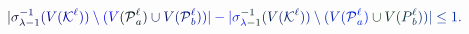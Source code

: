 \documentclass[12pt]{article}
\begin{document}
\makeatletter
\renewcommand*{\@textcolor}[3]{%
  \protect\leavevmode
  \begingroup
    \color#1{#2}#3%
  \endgroup
}
\makeatother
\begin{displaymath}
\mathcolor[RGB]{0,0,15}{|} \mathcolor[RGB]{0,0,30}{\sigma} _ { \mathcolor[RGB]{0,0,45}{\lambda} \mathcolor[RGB]{0,0,60}{-} \mathcolor[RGB]{0,0,75}{1} } ^ { \mathcolor[RGB]{0,0,90}{-} \mathcolor[RGB]{0,0,105}{1} } \mathcolor[RGB]{0,0,120}{(} \mathcolor[RGB]{0,0,135}{V} \mathcolor[RGB]{0,0,150}{(} \mathcal { \mathcolor[RGB]{0,0,165}{K} } ^ { \mathcolor[RGB]{0,0,180}{\ell} } \mathcolor[RGB]{0,0,195}{)} \mathcolor[RGB]{0,0,210}{)} \mathcolor[RGB]{0,0,225}{\setminus} \mathcolor[RGB]{0,0,240}{(} \mathcolor[RGB]{0,0,255}{V} \mathcolor[RGB]{0,15,0}{(} \mathcal { \mathcolor[RGB]{0,15,15}{P} } _ { \mathcolor[RGB]{0,15,30}{a} } ^ { \mathcolor[RGB]{0,15,45}{\ell} } \mathcolor[RGB]{0,15,60}{)} \mathcolor[RGB]{0,15,75}{\cup} \mathcolor[RGB]{0,15,90}{V} \mathcolor[RGB]{0,15,105}{(} \mathcal { \mathcolor[RGB]{0,15,120}{P} } _ { \mathcolor[RGB]{0,15,135}{b} } ^ { \mathcolor[RGB]{0,15,150}{\ell} } \mathcolor[RGB]{0,15,165}{)} \mathcolor[RGB]{0,15,180}{)} \mathcolor[RGB]{0,15,195}{|} \mathcolor[RGB]{0,15,210}{-} \mathcolor[RGB]{0,15,225}{|} \mathcolor[RGB]{0,15,240}{\sigma} _ { \mathcolor[RGB]{0,15,255}{\lambda} \mathcolor[RGB]{0,30,0}{-} \mathcolor[RGB]{0,30,15}{1} } ^ { \mathcolor[RGB]{0,30,30}{-} \mathcolor[RGB]{0,30,45}{1} } \mathcolor[RGB]{0,30,60}{(} \mathcolor[RGB]{0,30,75}{V} \mathcolor[RGB]{0,30,90}{(} \mathcal { \mathcolor[RGB]{0,30,105}{K} } ^ { \mathcolor[RGB]{0,30,120}{\ell} } \mathcolor[RGB]{0,30,135}{)} \mathcolor[RGB]{0,30,150}{)
\setminus} \mathcolor[RGB]{0,30,165}{(} \mathcolor[RGB]{0,30,180}{V} \mathcolor[RGB]{0,30,195}{(} \mathcal { \mathcolor[RGB]{0,30,210}{P} } _ { \mathcolor[RGB]{0,30,225}{a} } ^ { \mathcolor[RGB]{0,30,240}{\ell} } \mathcolor[RGB]{0,30,255}{)} \mathcolor[RGB]{0,45,0}{\cup} \mathcolor[RGB]{0,45,15}{V} \mathcolor[RGB]{0,45,30}{(} \mathcolor[RGB]{0,45,45}{\mathscr} { \mathcolor[RGB]{0,45,60}{P} } _ { \mathcolor[RGB]{0,45,75}{b} } ^ { \mathcolor[RGB]{0,45,90}{\ell} } \mathcolor[RGB]{0,45,105}{)} \mathcolor[RGB]{0,45,120}{)} \mathcolor[RGB]{0,45,135}{|} \mathcolor[RGB]{0,45,150}{\leq} \mathcolor[RGB]{0,45,165}{1} \mathcolor[RGB]{0,45,180}{.}
\end{displaymath}
\end{document}

